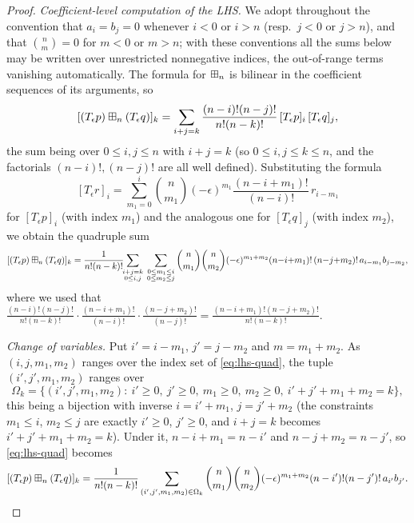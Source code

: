 \begin{proof}
\smallskip\noindent\textit{Coefficient-level computation of the LHS.}
We adopt throughout the convention that $a_i=b_j=0$ whenever $i<0$ or $i>n$
(resp.\ $j<0$ or $j>n$), and that $\binom{n}{m}=0$ for $m<0$ or $m>n$; with
these conventions all the sums below may be written over unrestricted
nonnegative indices, the out-of-range terms vanishing automatically. The formula
for $\boxplus_n$ is bilinear in the coefficient sequences of its arguments, so
\[
[(T_\epsilon p)\boxplus_n(T_\epsilon q)]_k
= \sum_{i+j=k}\frac{(n-i)!(n-j)!}{n!(n-k)!}\,[T_\epsilon p]_i\,[T_\epsilon q]_j ,
\]
the sum being over $0\le i,j\le n$ with $i+j=k$ (so $0\le i,j\le k\le n$, and the
factorials $(n-i)!,(n-j)!$ are all well defined). Substituting the formula
\[
[T_\epsilon r]_i=\sum_{m_1=0}^{i}\binom{n}{m_1}(-\epsilon)^{m_1}\frac{(n-i+m_1)!}{(n-i)!}\,r_{i-m_1}
\]
for $[T_\epsilon p]_i$ (with index $m_1$) and the analogous one for
$[T_\epsilon q]_j$ (with index $m_2$), we obtain the quadruple sum
\begin{equation}\label{eq:lhs-quad}
[(T_\epsilon p)\boxplus_n(T_\epsilon q)]_k
=\frac{1}{n!(n-k)!}\!\!\sum_{\substack{i+j=k\\ 0\le i,j}}\;
\sum_{\substack{0\le m_1\le i\\ 0\le m_2\le j}}
\binom{n}{m_1}\binom{n}{m_2}(-\epsilon)^{m_1+m_2}
(n{-}i{+}m_1)!\,(n{-}j{+}m_2)!\,a_{i-m_1}b_{j-m_2},
\end{equation}
where we used that $\frac{(n-i)!(n-j)!}{n!(n-k)!}\cdot\frac{(n-i+m_1)!}{(n-i)!}\cdot\frac{(n-j+m_2)!}{(n-j)!}
=\frac{(n-i+m_1)!(n-j+m_2)!}{n!(n-k)!}$.

\smallskip\noindent\emph{Change of variables.}
Put $i'=i-m_1$, $j'=j-m_2$ and $m=m_1+m_2$. As $(i,j,m_1,m_2)$ ranges over the
index set of \eqref{eq:lhs-quad}, the tuple $(i',j',m_1,m_2)$ ranges over
\[
\Omega_k=\bigl\{(i',j',m_1,m_2):\ i'\ge0,\ j'\ge0,\ m_1\ge0,\ m_2\ge0,\ i'+j'+m_1+m_2=k\bigr\},
\]
this being a bijection with inverse $i=i'+m_1$, $j=j'+m_2$ (the constraints
$m_1\le i$, $m_2\le j$ are exactly $i'\ge0$, $j'\ge0$, and $i+j=k$ becomes
$i'+j'+m_1+m_2=k$). Under it, $n-i+m_1=n-i'$ and $n-j+m_2=n-j'$, so
\eqref{eq:lhs-quad} becomes
\[
[(T_\epsilon p)\boxplus_n(T_\epsilon q)]_k
=\frac{1}{n!(n-k)!}\sum_{(i',j',m_1,m_2)\in\Omega_k}
\binom{n}{m_1}\binom{n}{m_2}(-\epsilon)^{m_1+m_2}(n-i')!(n-j')!\,a_{i'}b_{j'}.
\]


\end{proof}
